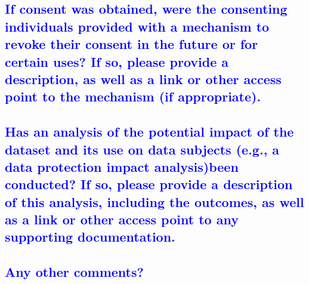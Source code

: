 \documentclass[letterpaper, 10 pt, conference]{ieeeconf}  %
\begin{document}
\textcolor{blue}{\subsection{If consent was obtained, were the consenting individuals provided
with a mechanism to revoke their consent in the future or for certain
uses? If so, please provide a description, as well as a link or other access
point to the mechanism (if appropriate).}}
\lipsum[1]

\textcolor{blue}{\subsection{Has an analysis of the potential impact of the dataset and its use
on data subjects (e.g., a data protection impact analysis)been conducted? If so, please provide a description of this analysis, including the
outcomes, as well as a link or other access point to any supporting documentation.}}
\lipsum[1]

\textcolor{blue}{\subsection{Any other comments?}}
\lipsum[1]

\medskip
 
  

\end{document}
